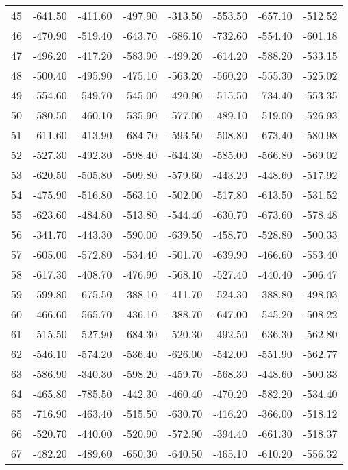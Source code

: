 \begin{longtable}{rrrrrrrr}
45 & -641.50 & -411.60 & -497.90 & -313.50 & -553.50 & -657.10 & -512.52  \\
46 & -470.90 & -519.40 & -643.70 & -686.10 & -732.60 & -554.40 & -601.18  \\
47 & -496.20 & -417.20 & -583.90 & -499.20 & -614.20 & -588.20 & -533.15  \\
48 & -500.40 & -495.90 & -475.10 & -563.20 & -560.20 & -555.30 & -525.02  \\
49 & -554.60 & -549.70 & -545.00 & -420.90 & -515.50 & -734.40 & -553.35  \\
50 & -580.50 & -460.10 & -535.90 & -577.00 & -489.10 & -519.00 & -526.93  \\
51 & -611.60 & -413.90 & -684.70 & -593.50 & -508.80 & -673.40 & -580.98  \\
52 & -527.30 & -492.30 & -598.40 & -644.30 & -585.00 & -566.80 & -569.02  \\
53 & -620.50 & -505.80 & -509.80 & -579.60 & -443.20 & -448.60 & -517.92  \\
54 & -475.90 & -516.80 & -563.10 & -502.00 & -517.80 & -613.50 & -531.52  \\
55 & -623.60 & -484.80 & -513.80 & -544.40 & -630.70 & -673.60 & -578.48  \\
56 & -341.70 & -443.30 & -590.00 & -639.50 & -458.70 & -528.80 & -500.33  \\
57 & -605.00 & -572.80 & -534.40 & -501.70 & -639.90 & -466.60 & -553.40  \\
58 & -617.30 & -408.70 & -476.90 & -568.10 & -527.40 & -440.40 & -506.47  \\
59 & -599.80 & -675.50 & -388.10 & -411.70 & -524.30 & -388.80 & -498.03  \\
60 & -466.60 & -565.70 & -436.10 & -388.70 & -647.00 & -545.20 & -508.22  \\
61 & -515.50 & -527.90 & -684.30 & -520.30 & -492.50 & -636.30 & -562.80  \\
62 & -546.10 & -574.20 & -536.40 & -626.00 & -542.00 & -551.90 & -562.77  \\
63 & -586.90 & -340.30 & -598.20 & -459.70 & -568.30 & -448.60 & -500.33  \\
64 & -465.80 & -785.50 & -442.30 & -460.40 & -470.20 & -582.20 & -534.40  \\
65 & -716.90 & -463.40 & -515.50 & -630.70 & -416.20 & -366.00 & -518.12  \\
66 & -520.70 & -440.00 & -520.90 & -572.90 & -394.40 & -661.30 & -518.37  \\
67 & -482.20 & -489.60 & -650.30 & -640.50 & -465.10 & -610.20 & -556.32  \\

\end{longtable}
